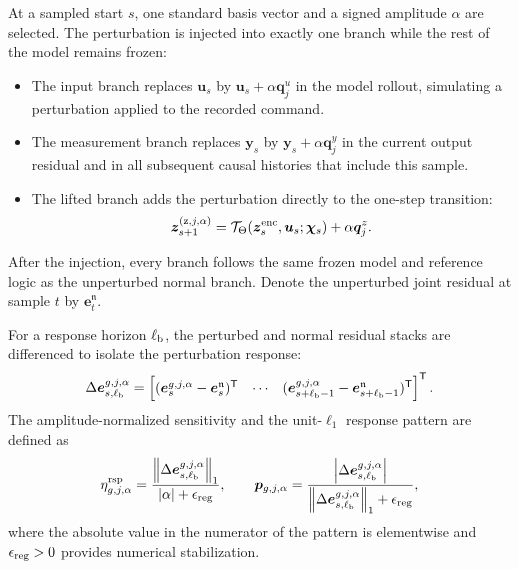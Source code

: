 \documentclass[journal]{IEEEtran}
\newcommand{\norm}[1]{\left\lVert #1\right\rVert}
\newcommand{\abs}[1]{\left\lvert #1\right\rvert}
\newcommand{\T}{\mathsf T}
\newcommand{\1}{\bm 1}
\begin{document}
At a sampled start $s$, one standard basis vector and a signed amplitude
$\alpha$ are selected. The perturbation is injected into exactly one branch
while the rest of the model remains frozen:
\begin{itemize}
\item The input branch replaces $\bm u_s$ by $\bm u_s+\alpha\bm q_j^u$ in the
model rollout, simulating a perturbation applied to the recorded command.
\item The measurement branch replaces $\bm y_s$ by $\bm y_s+\alpha\bm q_j^y$
in the current output residual and in all subsequent causal histories that
include this sample.
\item The lifted branch adds the perturbation directly to the one-step
transition:
\begin{equation}
\bm z_{s+1}^{(\mathrm z,j,\alpha)}
=\mathcal T_\Theta(\bm z_s^{\rm enc},\bm u_s;\bm\chi_s)
+\alpha\bm q_j^z.
\label{eq:lifted_perturbation}
\end{equation}
\end{itemize}
After the injection, every branch follows the same frozen model and reference
logic as the unperturbed normal branch. Denote the unperturbed joint residual
at sample $t$ by $\bm e_t^{\mathfrak n}$.

For a response horizon $\ell_{\rm b}$, the perturbed and normal residual
stacks are differenced to isolate the perturbation response:
\begin{equation}
\Delta\bm e_{s,\ell_{\rm b}}^{g,j,\alpha}
=
\begin{bmatrix}
(\bm e_s^{g,j,\alpha}-\bm e_s^{\mathfrak n})^\T&
\cdots&
(\bm e_{s+\ell_{\rm b}-1}^{g,j,\alpha}
-\bm e_{s+\ell_{\rm b}-1}^{\mathfrak n})^\T
\end{bmatrix}^{\T}.
\label{eq:response_increment}
\end{equation}
The amplitude-normalized sensitivity and the unit-$\ell_1$ response pattern
are defined as
\begin{equation}
\eta_{g,j,\alpha}^{\rm rsp}=
\frac{\norm{\Delta\bm e_{s,\ell_{\rm b}}^{g,j,\alpha}}_1}
{\abs{\alpha}+\epsilon_{\rm reg}},
\qquad
\bm p_{g,j,\alpha}=
\frac{\abs{\Delta\bm e_{s,\ell_{\rm b}}^{g,j,\alpha}}}
{\norm{\Delta\bm e_{s,\ell_{\rm b}}^{g,j,\alpha}}_1+\epsilon_{\rm reg}},
\label{eq:response_pattern}
\end{equation}
where the absolute value in the numerator of the pattern is elementwise and
$\epsilon_{\rm reg}>0$ provides numerical stabilization.
\end{document}

